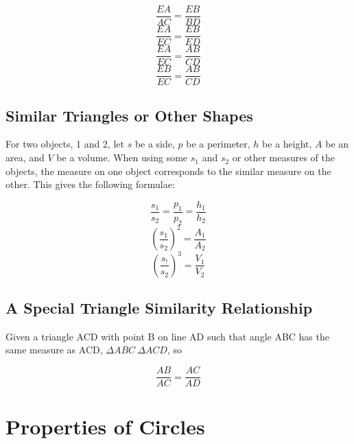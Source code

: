 \documentclass[draft, letterpaper, 12pt]{article}
\begin{document}
		\begin{equation}
			\frac{EA}{AC} = \frac{EB}{BD}
		\end{equation}
		\begin{equation}
			\frac{EA}{EC} = \frac{EB}{ED}
		\end{equation}
		\begin{equation}
			\frac{EA}{EC} = \frac{AB}{CD}
		\end{equation}
		\begin{equation}
			\frac{EB}{EC} = \frac{AB}{CD}
		\end{equation}
	
	\subsection{Similar Triangles or Other Shapes}\label{sec: simple proportions between properties of various similar objects}
		For two objects, 1 and 2, let $s$ be a side, $p$ be a perimeter, $h$ be a height, $A$ be an area, and $V$ be a volume. When using some $s_1$ and $s_2$ or other measures of the objects, the measure on one object corresponds to the similar measure on the other. This gives the following formulae:
		
		\begin{equation}
			\frac{s_1}{s_2} = \frac{p_1}{p_2} = \frac{h_1}{h_2}
		\end{equation}
		\begin{equation}
			\left(\frac{s_1}{s_2}\right)^2 = \frac{A_1}{A_2}
		\end{equation}
		\begin{equation}
			\left(\frac{s_!}{s_2}\right)^3 = \frac{V_1}{V_2}
		\end{equation}
	
	\subsection{A Special Triangle Similarity Relationship}\label{sec: a common problem about similar triangles}
		Given a triangle ACD with point B on line AD such that angle ABC has the same measure as ACD, $\Delta ABC ~ \Delta ACD$, so
		
		\begin{equation}
			\frac{AB}{AC} = \frac{AC}{AD}
		\end{equation}
	
\section{Properties of Circles}
\end{document}
